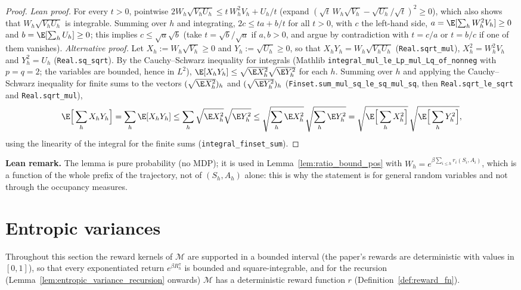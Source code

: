\begin{proof}
\leanok
\emph{Lean proof.} For every $t > 0$, pointwise
$2W_h\sqrt{V_h U_h} \le t\,W_h^2V_h + U_h/t$ (expand $(\sqrt t\,W_h\sqrt{V_h} - \sqrt{U_h}/\sqrt t)^2 \ge 0$),
which also shows that $W_h\sqrt{V_h U_h}$ is integrable. Summing over $h$ and integrating,
$2c \le t a + b/t$ for all $t > 0$, with $c$ the left-hand side,
$a = \E[\sum_h W_h^2V_h] \ge 0$ and $b = \E[\sum_h U_h] \ge 0$; this implies $c \le \sqrt a\sqrt b$
(take $t = \sqrt b/\sqrt a$ if $a, b > 0$, and argue by contradiction with $t = c/a$ or $t = b/c$ if
one of them vanishes). \emph{Alternative proof.}
Let $X_h := W_h\sqrt{V_h} \ge 0$ and $Y_h := \sqrt{U_h} \ge 0$, so that
$X_h Y_h = W_h\sqrt{V_h U_h}$ (\texttt{Real.sqrt\_mul}), $X_h^2 = W_h^2 V_h$ and $Y_h^2 = U_h$
(\texttt{Real.sq\_sqrt}). By the Cauchy--Schwarz inequality for integrals (Mathlib
\texttt{integral\_mul\_le\_Lp\_mul\_Lq\_of\_nonneg} with $p = q = 2$; the variables are bounded,
hence in $L^2$), $\E[X_h Y_h] \le \sqrt{\E X_h^2}\sqrt{\E Y_h^2}$ for each $h$. Summing over
$h$ and applying the Cauchy--Schwarz inequality for finite sums to the vectors
$(\sqrt{\E X_h^2})_h$ and $(\sqrt{\E Y_h^2})_h$ (\texttt{Finset.sum\_mul\_sq\_le\_sq\_mul\_sq},
then \texttt{Real.sqrt\_le\_sqrt} and \texttt{Real.sqrt\_mul}),
\[
  \E\Big[\sum_h X_h Y_h\Big] = \sum_h\E[X_h Y_h] \le \sum_h\sqrt{\E X_h^2}\sqrt{\E Y_h^2}
  \le \sqrt{\sum_h\E X_h^2}\,\sqrt{\sum_h\E Y_h^2}
  = \sqrt{\E\Big[\sum_h X_h^2\Big]}\,\sqrt{\E\Big[\sum_h Y_h^2\Big]} ,
\]
using the linearity of the integral for the finite sums (\texttt{integral\_finset\_sum}).
\end{proof}

\textbf{Lean remark.} The lemma is pure probability (no MDP); it is used in
Lemma~\ref{lem:ratio_bound_pos} with $W_h = e^{\beta\sum_{i \le h} r_i(S_i,A_i)}$, which is
a function of the whole prefix of the trajectory, not of $(S_h, A_h)$ alone: this is why the
statement is for general random variables and not through the occupancy measures.

\section{Entropic variances}
\label{sec:pre_mdp_entropic_variance}

Throughout this section the reward kernels of $\mathcal M$ are supported in a bounded
interval (the paper's rewards are deterministic with values in $[0, 1]$), so that every
exponentiated return $e^{\beta R^\pi_h}$ is bounded and square-integrable, and for the
recursion (Lemma~\ref{lem:entropic_variance_recursion} onwards) $\mathcal M$ has a
deterministic reward function $r$ (Definition~\ref{def:reward_fn}).

